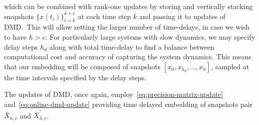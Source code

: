 which can be combined with rank-one updates by storing and vertically stacking snapshots \({\{x(t_i)\}}^{k+c}_{i=k}\) at each time step \(k\) and passing it to updates of DMD.~This will allow setting the larger number of time-delays, in case we wish to have \(h > c\). For particularly large systems with slow dynamics, we may specify delay steps \(h_d\) along with total time-delay to find a balance between computational cost and accuracy of capturing the system dynamics. This means that our embedding will be composed of snapshots \( [x_0, x_{h_d}, \ldots, x_h] \), sampled at the time intervals specified by the delay steps.

The updates of DMD, once again, employ~\eqref{eq:precision-matrix-update} and~\eqref{eq:online-dmd-update} providing time delayed embedding of snapshots pair \(\bar{X}_{h, c}\) and \(\bar{X}^\prime_{h, c}\).
